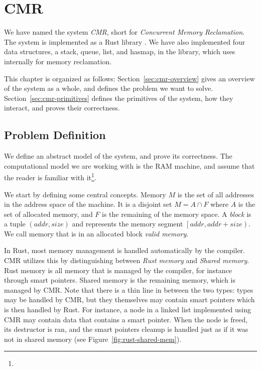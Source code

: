 \chapter{CMR\label{ch:cmr}}

We have named the system \emph{CMR}, short for \emph{Concurrent Memory Reclamation}. The system is
implemented as a Rust library . We have also implemented four data structures, a stack,
queue, list, and hasmap, in the  library, which uses 
internally for memory reclamation.

This chapter is organized as follows:
Section~\ref{sec:cmr-overview} gives an overview of the system as a whole, and defines the problem
we want to solve.
Section~\ref{sec:cmr-primitives} defines the primitives of the system, how they interact, and
proves their correctness.

\section{Problem Definition}

We define an abstract model of the system, and prove its correctness.
The computational model we are working with is the RAM machine, and assume that
the reader is familiar with it\footnote{}.

We start by defining some central concepts.
Memory $M$ is the set of all addresses in the address space of the machine.
It is a disjoint set $M = A \cap F$ where $A$ is the set of allocated memory, and $F$ is the
remaining of the memory space.
A \emph{block} is a tuple $(addr, size)$ and represents the memory segment $\left[addr, addr +
size\right)$.
We call memory that is in an allocated block \emph{valid memory}.

In Rust, most memory management is handled automatically by the compiler. CMR utilizes this by
distinguishing between \emph{Rust memory} and \emph{Shared memory}. Rust memory is all memory that
is managed by the compiler, for instance through smart pointers. Shared memory is the remaining
memory, which is managed by CMR\@. Note that there is a thin line in between the two types: types may
be handled by CMR, but they themselves may contain smart pointers which is then handled by Rust.
For instance, a node in a linked list implemented using CMR may contain data that contains a smart
pointer. When the node is freed, its destructor is ran, and the smart pointers cleanup is handled
just as if it was not in shared memory (see Figure~\ref{fig:rust-shared-mem}).

